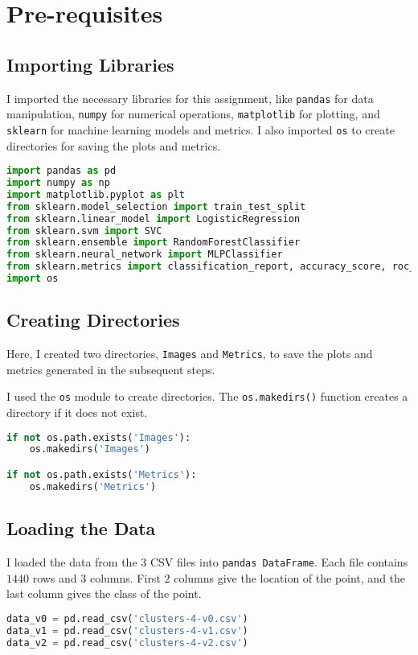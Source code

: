 \section*{Pre-requisites}

\subsection*{Importing Libraries}

I imported the necessary libraries for this assignment, like \texttt{pandas} for data manipulation, \texttt{numpy} for numerical operations, \texttt{matplotlib} for plotting, and \texttt{sklearn} for machine learning models and metrics. I also imported \texttt{os} to create directories for saving the plots and metrics.

\begin{lstlisting}[language=Python, caption=Importing Libraries]
import pandas as pd
import numpy as np
import matplotlib.pyplot as plt
from sklearn.model_selection import train_test_split
from sklearn.linear_model import LogisticRegression
from sklearn.svm import SVC
from sklearn.ensemble import RandomForestClassifier
from sklearn.neural_network import MLPClassifier
from sklearn.metrics import classification_report, accuracy_score, roc_auc_score, roc_curve
import os
\end{lstlisting}

\subsection*{Creating Directories}

Here, I created two directories, \texttt{Images} and \texttt{Metrics}, to save the plots and metrics generated in the subsequent steps.

\begin{remark*}
    I used the \texttt{os} module to create directories. The \texttt{os.makedirs()} function creates a directory if it does not exist.
\end{remark*}

\begin{lstlisting}[language=Python, caption=Creating Directories]
if not os.path.exists('Images'):
    os.makedirs('Images')

if not os.path.exists('Metrics'):
    os.makedirs('Metrics')
\end{lstlisting}

\subsection*{Loading the Data}

I loaded the data from the $3$ CSV files into \texttt{pandas DataFrame}. Each file contains $1440$ rows and $3$ columns. First $2$ columns give the location of the point, and the last column gives the class of the point.

\begin{lstlisting}[language=Python, caption=Loading the Data]
data_v0 = pd.read_csv('clusters-4-v0.csv')
data_v1 = pd.read_csv('clusters-4-v1.csv')
data_v2 = pd.read_csv('clusters-4-v2.csv')
\end{lstlisting}



